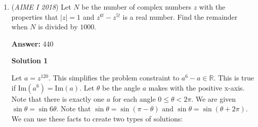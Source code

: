 \begin{enumerate}
Do as done in Solution 1 to get 
 \[x^2+xy-2y^2=0\] 
 \[\implies (\frac{x}{y})^2+\frac{x}{y}-2=0\] 
 \[\implies \frac{x}{y}=\frac{-1\pm\sqrt{1+8}}{2}=1,-2\] Do as done in Solution 1 to get 
 \[9x^2+6xy+y^2=3x^2+4xy+Ky^2\] 
 \[\implies 6x^2+2xy+(1-K)y^2=0\] 
 \[\implies 6(\frac{x}{y})^2+2\frac{x}{y}+(1-K)=0\] 
 \[\implies \frac{x}{y}=\frac{-2\pm \sqrt{4-24(1-K)}}{12}\] 
 \[\implies \frac{x}{y}=\frac{-2\pm 2\sqrt{6K-5}}{12}=\frac{-1\pm \sqrt{6K-5}}{6}\]If $\frac{x}{y}=1$ then 
 \[1=\frac{-1\pm \sqrt{6K-5}}{6}\] 
 \[\implies 6=-1\pm \sqrt{6K-5}\] 
 \[\implies 7=\pm \sqrt{6K-5}\] 
 \[\implies 49=6K-5\] 
 \[\implies K=9\]If $\frac{x}{y}=-2$ then 
 \[-2=\frac{-1\pm \sqrt{6K-5}}{6}\] 
 \[\implies -12=-1\pm \sqrt{6K-5}\] 
 \[\implies -11=\sqrt{6K-5}\] 
 \[\implies 121=6K-5\] 
 \[\implies 126=6K\] 
 \[\implies K=21\]Hence our final answer is $21\cdot 9=\boxed{189}$-vsamc$\newline$




\textbf{Solution 3 (Official MAA)}

Because $x^2+xy+7y^2=\left(x+\frac{y}{2}\right)^2+\frac{27}{4}y^2>0,$ the right side of the first equation is real. It follows that the left side of the equation is also real, so $2x+y>0$ and 
 \[\log_2(2x+y)=\log_{2^2}(2x+y)^2=\log_4(4x^2+4xy+y^2).\] Thus $4x^2+4xy+y^2=x^2+xy+7y^2,$ which implies that $0=x^2+xy-2y^2=(x+2y)(x-y).$ Therefore either $x=-2y$ or $x=y,$ and because $2x+y>0,$ $x$ must be positive and $3x+y=x+(2x+y)>0.$ Similarly, 
 \[\log_3(3x+y)=\log_{3^2}(3x+y)^2=\log_9(9x^2+6xy+y^2).\] If $x=-2y\ne 0,$ then $9x^2+6xy+y^2=36y^2-12y^2+y^2=25y^2=3x^2+4xy+Ky^2$ when $K=21.$ If $x=y\ne 0,$ then $9x^2+6xy+y^2=16y^2=3x^2+4xy+Ky^2$ when $K=9.$ The requested product is $21\cdot9=189.$



	\item (\textit{AIME I 2018}) Let $N$ be the number of complex numbers $z$ with the properties that $|z|=1$ and $z^{6!}-z^{5!}$ is a real number. Find the remainder when $N$ is divided by $1000$.


 
 \textbf{Answer: }440



\textbf{Solution 1}

Let $a=z^{120}$. This simplifies the problem constraint to $a^6-a \in \mathbb{R}$. This is true if $\text{Im}(a^6)=\text{Im}(a)$. Let $\theta$ be the angle $a$ makes with the positive x-axis. Note that there is exactly one $a$ for each angle $0\le\theta<2\pi$. We are given $\sin\theta = \sin{6\theta}$. Note that $\sin \theta = \sin (\pi - \theta)$ and $\sin \theta = \sin (\theta + 2\pi)$. We can use these facts to create two types of solutions: 


\end{enumerate}
